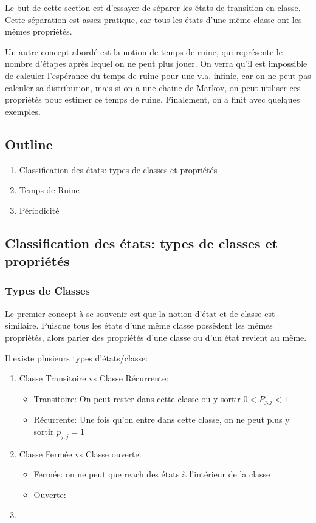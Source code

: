 \documentclass{article}
\begin{document}
Le but de cette section est d'essayer de séparer les états de transition
en classe. Cette séparation est assez pratique, car tous les états d'une
même classe ont les mêmes propriétés.

Un autre concept abordé est la notion de temps de ruine, qui représente
le nombre d'étapes après lequel on ne peut plus jouer. On verra qu'il
est impossible de calculer l'espérance du temps de ruine pour une v.a.
infinie, car on ne peut pas calculer sa distribution, mais si on a
une chaine de Markov, on peut utiliser ces propriétés pour estimer ce
temps de ruine. Finalement, on a finit avec quelques exemples.

\subsection*{Outline}
\begin{enumerate}
    \item Classification des états: types de classes et propriétés
    \item Temps de Ruine
    \item Périodicité
\end{enumerate}

\subsection{Classification des états: types de classes et propriétés}

\subsubsection{Types de Classes}%
\label{ssub:Types de Classes}

Le premier concept à se souvenir est que la notion d'état et de classe
est similaire. Puisque tous les états d'une même classe possèdent les
mêmes propriétés, alors parler des propriétés d'une classe ou d'un état
revient au même.

Il existe plusieurs types d'états/classe:
\begin{enumerate}
    \item Classe Transitoire vs Classe Récurrente:
	\begin{itemize}
	    \item Transitoire: On peut rester dans cette classe ou y sortir
		$ 0 < P_{j,j} < 1 $
	    \item Récurrente: Une fois qu'on entre dans cette classe, on
		ne peut plus y sortir $ p_{j,j} = 1 $
	\end{itemize}
    \item Classe Fermée vs Classe ouverte:
	\begin{itemize}
	    \item Fermée: on ne peut que reach des états à l'intérieur de
		la classe
	    \item Ouverte:
	\end{itemize}
    \item
\end{enumerate}
\end{document}
